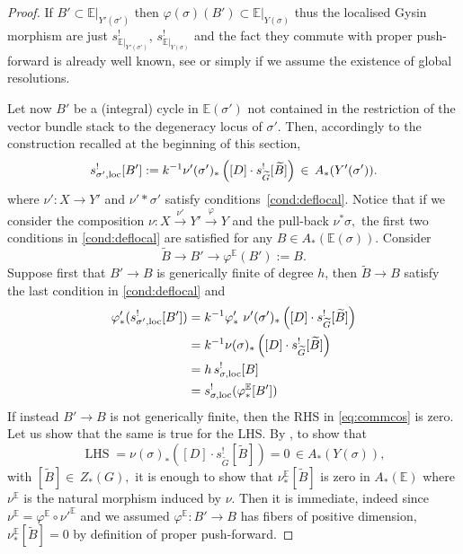 \documentclass[11pt]{amsart}
\renewcommand{\to}{\rightarrow}
\theoremstyle{plain}
\theoremstyle{definition}
\begin{document}
\begin{proof}
If $B'\subset \mathbb{E}\rvert_{Y'(\sigma')}$ then $\varphi(\sigma)(B')\subset \mathbb{E}\rvert_{Y(\sigma)}$
thus the localised Gysin morphism are just $s^!_{\mathbb{E}\rvert_{Y'(\sigma')}}$, $s^!_{\mathbb{E}\rvert_{Y(\sigma)}}$ and the fact they commute with proper push-forward is already well known, see \cite{Kresh} or simply \cite[Chapter~4]{Fulton} if we assume the existence of global resolutions.

Let now $B'$ be a (integral) cycle in $\mathbb{E}(\sigma')$ not contained in  the restriction of the vector bundle stack to the degeneracy locus of $\sigma'.$ Then, accordingly to the construction recalled at the beginning of this section, 
 \[s^!_{\sigma',\rm{loc}}[B']:=k^{-1} \nu'(\sigma')_*\left([D]\cdot s^!_{\widetilde{G}}[\widetilde{B}]\right)\,\in\,A_*(Y'(\sigma')).\]
 where $\nu'\colon X\to Y'$ and $\nu'*\sigma'$ satisfy conditions~\eqref{cond:deflocal}. Notice that if we consider the composition
 $\nu\colon X\xrightarrow{\nu'} Y'\xrightarrow{\varphi} Y$ and the pull-back $\nu^*\sigma,$ the first two conditions in \eqref{cond:deflocal} are satisfied for any $B\in A_*(\mathbb E(\sigma)).$ 
 Consider 
 \[\widetilde{B}\to B'\to \varphi^{\mathbb{E}}(B'):=B.\]
 Suppose first that $B'\to B$ is generically finite of degree $h$, then $\widetilde{B}\to B$ satisfy the last condition in \eqref{cond:deflocal} and
 \begin{align*}
 \varphi'_*( s^!_{\sigma',\rm{loc}}[B'])&= k^{-1}\varphi'_*\ \nu'(\sigma')_*\left([D]\cdot s^!_{\widetilde{G}}[\widetilde{B}]\right)\\
 &=k^{-1} \nu(\sigma)_*\left([D]\cdot s^!_{\widetilde{G}}[\widetilde{B}]\right)\\
 &=h\, s_{\sigma,\rm{loc}}^![B]\\
 &=s_{\sigma,\rm{loc}}^!(\varphi^{\mathbb{E}}_*[B'])
 \end{align*}
If instead $B'\to B$ is not generically finite, then the RHS  in \eqref{eq:commcos} is zero. Let us show that the same is true for the LHS. By \cite[Lemma~2.7]{KLcosection}, to show that 
\[\operatorname{LHS}=\nu(\sigma)_*\left([D]\cdot s^!_{\widetilde{G}}[\widetilde{B}]\right)=0\,\in A_*(Y(\sigma)),\]
with $[\widetilde{B}]\in \, Z_*(G),$
it is enough to show that $\nu_*^{\mathbb{E}}[\widetilde B]$ is zero in $A_*(\mathbb{E})$ where $\nu^{\mathbb{E}}$ is the natural morphism induced by $\nu.$ Then it is immediate, indeed since  $\nu^{\mathbb{E}}=\varphi^{\mathbb{E}}\circ\nu'^{\mathbb{E}}$  and we assumed $\varphi^{\mathbb{E}}\colon B'\to B$ has fibers of positive dimension, $\nu_*^{\mathbb{E}}[\widetilde B]=0$ by definition of proper push-forward.

 
 
\end{proof}
\end{document}

